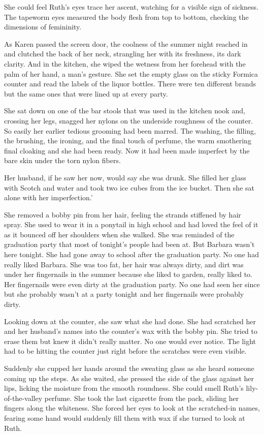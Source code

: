 \documentclass[
]{article}
\begin{document}
She could feel Ruth's eyes trace her ascent, watching for a visible sign
of sickness. The tape­worm eyes measured the body flesh from top to
bottom, checking the dimensions of femininity.

As Karen passed the screen door, the coolness of the summer night
reached in and clutched the back of her neck, strangling her with its
freshness, its dark clarity. And in the kitchen, she wiped the wetness
from her forehead with the palm of her hand, a man's gesture. She set
the empty glass on the sticky Formica counter and read the labels of the
liquor bottles. There were ten different brands but the same ones that
were lined up at every party.

She sat down on one of the bar stools that was used in the kitchen nook
and, crossing her legs, snagged her nylons on the underside roughness of
the counter. So easily her earlier tedious grooming had been marred. The
washing, the filling, the brushing, the ironing, and the final touch of
perfume, the warm smothering final cloaking and she had been ready. Now
it had been made imperfect by the bare skin under the torn nylon fibers.

Her husband, if he saw her now, would say she was drunk. She filled her
glass with Scotch and water and took two ice cubes from the ice bucket.
Then she sat alone with her imperfection.'

She removed a bobby pin from her hair, feeling the strands stiffened by
hair spray. She used to wear it in a ponytail in high school and had
loved the feel of it as it bounced off her shoulders when she walked.
She was reminded of the graduation party that most of tonight's people
had been at. But Barbara wasn't here tonight. She had gone away to
school after the graduation party. No one had really liked Barbara. She
was too fat, her hair was always dirty, and dirt was under her
fingernails in the summer because she liked to garden, really liked to.
Her fingernails were even dirty at the graduation party. No one had seen
her since but she probably wasn't at a party tonight and her fingernails
were probably dirty.

Looking down at the counter, she saw what she had done. She had
scratched her and her husband's names into the counter's wax with the
bobby pin. She tried to erase them but knew it didn't really matter. No
one would ever notice. The light had to be hitting the counter just
right before the scratches were even visible.

Suddenly she cupped her hands around the sweating glass as she heard
someone coming up the steps. As she waited, she pressed the side of the
glass against her lips, licking the moisture from the smooth roundness.
She could smell Ruth's lily-of-the-valley perfume. She took the last
cigarette from the pack, sliding her fingers along the whiteness. She
forced her eyes to look at the scratched-in names, fearing some hand
would suddenly fill them with wax if she turned to look at Ruth.
\end{document}
